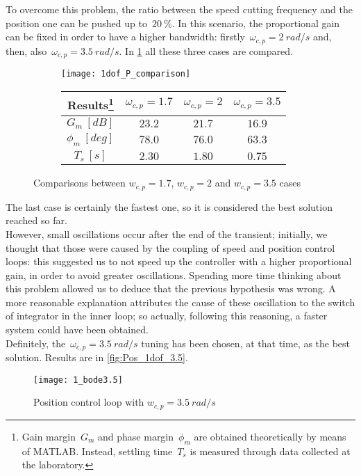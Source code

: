 To overcome this problem, the ratio between the speed cutting frequency and the position one can be pushed up to~$20\ \%$. In this scenario, the proportional gain can be fixed in order to have a higher bandwidth: firstly~$\omega_{c,p} = 2\ rad/s$ and, then, also~$\omega_{c,p} = 3.5\ rad/s$.
In \cref{fig:P1dof_step} all these three cases are compared.
\begin{figure*}[h]
	\centering
	\begin{subfigure}{0.45\columnwidth}
		\texttt{[image: 1dof\_P\_comparison]}
		\label{fig:P1dof_step}
	\end{subfigure}
	\begin{subfigure}{0.45\columnwidth}
		\begin{tabular}{|c|ccc|}
			\hline
			Results\footnote{Gain margin~$G_m$ and phase margin~$\phi_m$ are obtained theoretically by means of MATLAB. Instead, settling time~$T_s$ is measured through data collected at the laboratory.} & $\omega_{c,p}=1.7$ & $\omega_{c,p}=2$ & $\omega_{c,p}=3.5$ \\
			\hline
			$G_m\ [dB]$ & $23.2$ & $21.7$ & $16.9$ \\
			$\phi_m\ [deg]$ & $78.0$ & $76.0$ & $63.3$ \\
			\hline
			$T_s\ [s]$ & $2.30$ & $1.80$ & $0.75$ \\
			\hline
		\end{tabular}
	\end{subfigure}
	\caption{Comparisons between $w_{c,p}=1.7$, $w_{c,p}=2$ and $w_{c,p}=3.5$ cases}
	\label{fig:Bode and Step P 1dof comparison}
\end{figure*}
The last case is certainly the fastest one, so it is considered the best solution reached so far. \\
However, small oscillations occur after the end of the transient; initially, we thought that those were caused by the coupling of speed and position control loops: this suggested us to not speed up the controller with a higher proportional gain, in order to avoid greater oscillations. Spending more time thinking about this problem allowed us to deduce that the previous hypothesis was wrong. A more reasonable explanation attributes the cause of these oscillation to the switch of integrator in the inner loop; so actually, following this reasoning, a faster system could have been obtained. \\

Definitely, the~$\omega_{c,p} = 3.5\ rad/s$ tuning has been chosen, at that time, as the best solution. Results are in \cref{fig:Pos_1dof_3.5}.
\begin{figure*}[h]
	\centering
	\texttt{[image: 1\_bode3.5]}
	\caption{Position control loop with  $w_{c,p}=3.5\ rad/s$}
	\label{fig:Bode P 3.5}
\end{figure*}

